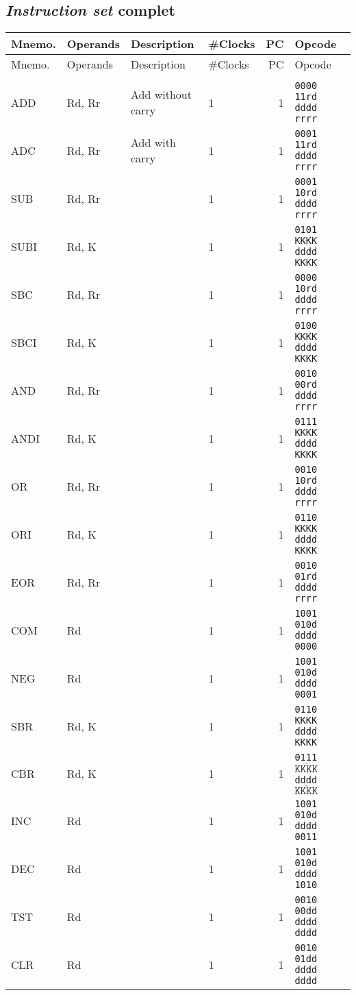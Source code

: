 \documentclass[11pt]{article}
\begin{document}
\subsection{\emph{Instruction set} complet}
\noindent\begin{center}
\begin{longtable}{|l|l| p{}|l|r|l|}
\hline
Mnemo. & Operands & Description & \#Clocks & PC & Opcode\\
\hline\hline
\endhead

\hline\hline
Mnemo. & Operands & Description & \#Clocks & PC & Opcode\\
\hline
\endfoot

\multicolumn{6}{|c|}{Arithmetic} \\\hline
ADD & Rd, Rr & Add without carry & 1 & 1 & \texttt{0000 11rd dddd rrrr}\\
ADC & Rd, Rr & Add with carry & 1 & 1 & \texttt{0001 11rd dddd rrrr}\\
SUB & Rd, Rr &  & 1 & 1 & \texttt{0001 10rd dddd rrrr}\\
SUBI & Rd, K &  & 1 & 1 & \texttt{0101 KKKK dddd KKKK}\\
SBC & Rd, Rr &  & 1 & 1 & \texttt{0000 10rd dddd rrrr}\\
SBCI & Rd, K &  & 1 & 1 & \texttt{0100 KKKK dddd KKKK}\\
AND & Rd, Rr &  & 1 & 1 & \texttt{0010 00rd dddd rrrr}\\
ANDI & Rd, K &  & 1 & 1 & \texttt{0111 KKKK dddd KKKK}\\
OR & Rd, Rr &  & 1 & 1 & \texttt{0010 10rd dddd rrrr}\\
ORI & Rd, K &  & 1 & 1 & \texttt{0110 KKKK dddd KKKK}\\
EOR & Rd, Rr &  & 1 & 1 & \texttt{0010 01rd dddd rrrr}\\
COM & Rd &  & 1 & 1 & \texttt{1001 010d dddd 0000}\\
NEG & Rd &  & 1 & 1 & \texttt{1001 010d dddd 0001}\\
SBR & Rd, K &  & 1 & 1 & \texttt{0110 KKKK dddd KKKK}\\
CBR & Rd, K &  & 1 & 1 & \texttt{0111 }$\overline{\texttt{KKKK}}$\texttt{ dddd }$\mathtt{\overline{KKKK}}$\\
INC & Rd &  & 1 & 1 & \texttt{1001 010d dddd 0011}\\
DEC & Rd &  & 1 & 1 & \texttt{1001 010d dddd 1010}\\
TST & Rd &  & 1 & 1 & \texttt{0010 00dd dddd dddd}\\
CLR & Rd &  & 1 & 1 & \texttt{0010 01dd dddd dddd}\\

\end{longtable}
\end{center}
\end{document}
